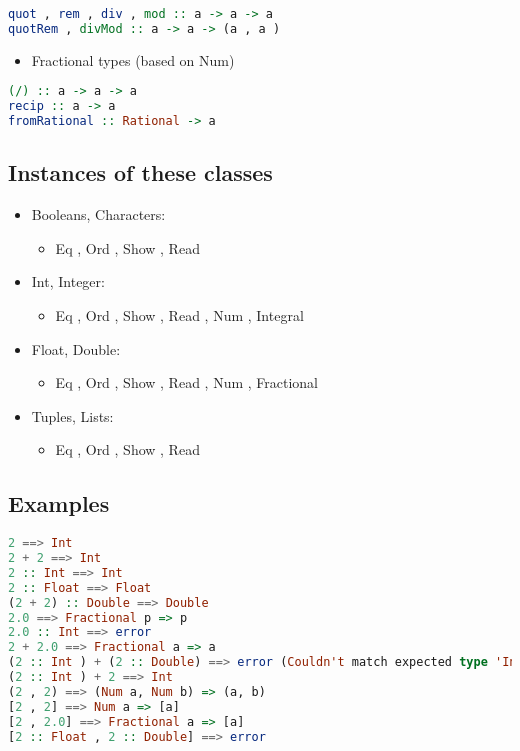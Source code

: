 \begin{lstlisting}[language=Haskell]
quot , rem , div , mod :: a -> a -> a
quotRem , divMod :: a -> a -> (a , a )
\end{lstlisting}

\begin{itemize}
\tightlist
\item
  Fractional types (based on Num)
\end{itemize}

\begin{lstlisting}[language=Haskell]
(/) :: a -> a -> a
recip :: a -> a
fromRational :: Rational -> a
\end{lstlisting}

\hypertarget{instances-of-these-classes}{%
\subsection{Instances of these
classes}\label{instances-of-these-classes}}

\begin{itemize}
\tightlist
\item
  Booleans, Characters:

  \begin{itemize}
  \tightlist
  \item
    Eq , Ord , Show , Read
  \end{itemize}
\item
  Int, Integer:

  \begin{itemize}
  \tightlist
  \item
    Eq , Ord , Show , Read , Num , Integral
  \end{itemize}
\item
  Float, Double:

  \begin{itemize}
  \tightlist
  \item
    Eq , Ord , Show , Read , Num , Fractional
  \end{itemize}
\item
  Tuples, Lists:

  \begin{itemize}
  \tightlist
  \item
    Eq , Ord , Show , Read
  \end{itemize}
\end{itemize}

\hypertarget{examples}{%
\subsection{Examples}\label{examples}}

\begin{lstlisting}[language=Haskell]
2 ==> Int
2 + 2 ==> Int
2 :: Int ==> Int
2 :: Float ==> Float
(2 + 2) :: Double ==> Double
2.0 ==> Fractional p => p
2.0 :: Int ==> error
2 + 2.0 ==> Fractional a => a
(2 :: Int ) + (2 :: Double) ==> error (Couldn't match expected type 'Int' with actual type 'Double')
(2 :: Int ) + 2 ==> Int
(2 , 2) ==> (Num a, Num b) => (a, b)
[2 , 2] ==> Num a => [a]
[2 , 2.0] ==> Fractional a => [a]
[2 :: Float , 2 :: Double] ==> error
\end{lstlisting}

\clearpage
